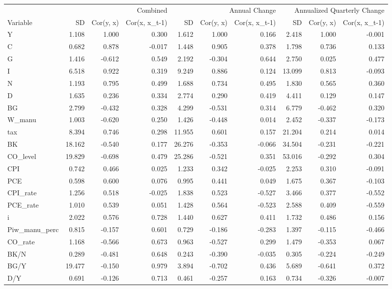 \begin{tabular}{lrrrrrrrrr}
\toprule
 & \multicolumn{3}{r}{Combined} & \multicolumn{3}{r}{Annual Change} & \multicolumn{3}{r}{Annualized Quarterly Change} \\
Variable & SD & Cor(y, x) & Cor(x, x_{t-1}) & SD & Cor(y, x) & Cor(x, x_{t-1}) & SD & Cor(y, x) & Cor(x, x_{t-1}) \\
\midrule
Y & 1.108 & 1.000 & 0.300 & 1.612 & 1.000 & 0.166 & 2.418 & 1.000 & -0.001 \\
C & 0.682 & 0.878 & -0.017 & 1.448 & 0.905 & 0.378 & 1.798 & 0.736 & 0.133 \\
G & 1.416 & -0.612 & 0.549 & 2.192 & -0.304 & 0.644 & 2.750 & 0.025 & 0.477 \\
I & 6.518 & 0.922 & 0.319 & 9.249 & 0.886 & 0.124 & 13.099 & 0.813 & -0.093 \\
N & 1.193 & 0.795 & 0.499 & 1.688 & 0.734 & 0.495 & 1.830 & 0.565 & 0.360 \\
D & 1.635 & 0.236 & 0.334 & 2.774 & 0.290 & 0.419 & 4.411 & 0.129 & 0.147 \\
BG & 2.799 & -0.432 & 0.328 & 4.299 & -0.531 & 0.314 & 6.779 & -0.462 & 0.320 \\
W_manu & 1.003 & -0.620 & 0.250 & 1.426 & -0.448 & 0.014 & 2.452 & -0.337 & -0.173 \\
tax & 8.394 & 0.746 & 0.298 & 11.955 & 0.601 & 0.157 & 21.204 & 0.214 & 0.014 \\
BK & 18.162 & -0.540 & 0.177 & 26.276 & -0.353 & -0.066 & 34.504 & -0.231 & -0.221 \\
CO_level & 19.829 & -0.698 & 0.479 & 25.286 & -0.521 & 0.351 & 53.016 & -0.292 & 0.304 \\
CPI & 0.742 & 0.466 & 0.025 & 1.233 & 0.342 & -0.025 & 2.253 & 0.310 & -0.091 \\
PCE & 0.598 & 0.600 & 0.076 & 0.995 & 0.441 & 0.049 & 1.675 & 0.367 & -0.103 \\
CPI_rate & 1.256 & 0.518 & -0.025 & 1.838 & 0.523 & -0.527 & 3.466 & 0.377 & -0.552 \\
PCE_rate & 1.010 & 0.539 & 0.051 & 1.428 & 0.564 & -0.523 & 2.588 & 0.409 & -0.559 \\
i & 2.022 & 0.576 & 0.728 & 1.440 & 0.627 & 0.411 & 1.732 & 0.486 & 0.156 \\
Piw_manu_perc & 0.815 & -0.157 & 0.601 & 0.729 & -0.186 & -0.283 & 1.397 & -0.115 & -0.466 \\
CO_rate & 1.168 & -0.566 & 0.673 & 0.963 & -0.527 & 0.299 & 1.479 & -0.353 & 0.067 \\
BK/N & 0.289 & -0.481 & 0.648 & 0.243 & -0.390 & -0.035 & 0.305 & -0.224 & -0.249 \\
BG/Y & 19.477 & -0.150 & 0.979 & 3.894 & -0.702 & 0.436 & 5.689 & -0.641 & 0.372 \\
D/Y & 0.691 & -0.126 & 0.713 & 0.461 & -0.257 & 0.163 & 0.734 & -0.326 & -0.007 \\
\bottomrule
\end{tabular}
